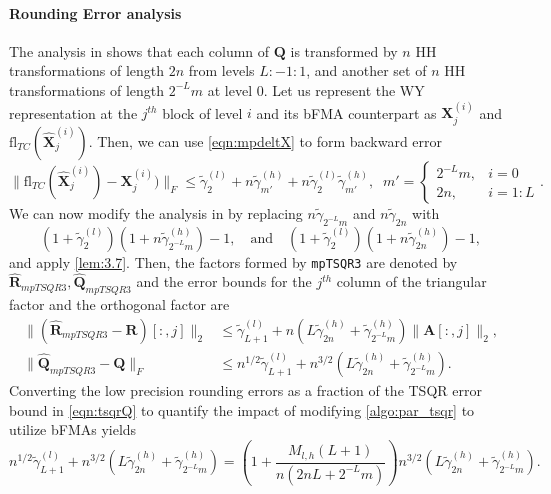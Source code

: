 \documentclass[review,onefignum,onetabnum]{siamart190516}
\newcommand{\bb}[1]{\mathbf{#1}}
\newcommand{\fl}{\mathrm{fl}}
\begin{document}
\paragraph{Rounding Error analysis} The analysis in \cite{Mori2012} shows that each column of $\bb{Q}$ is transformed by $n$ HH transformations of length $2n$ from levels $L:-1:1$, and another set of $n$ HH transformations of length $2^{-L}m$ at level $0$.
Let us represent the WY representation at the $j^{th}$ block of level $i$ and its bFMA counterpart as $\bb{X}_j^{(i)}$ and $\fl_{TC}(\hat{\bb{X}}_j^{(i)})$.
Then, we can use \cref{eqn:mpdeltX} to form backward error  
\begin{equation}
	\|\fl_{TC}(\hat{\bb{X}}_j^{(i)})-\bb{X}_j^{(i)})\|_F \leq \tilde{\gamma}_2^{(l)} +n\tilde{\gamma}_{m'}^{(h)} + n\tilde{\gamma}_2^{(l)}\tilde{\gamma}_{m'}^{(h)}, \;\; m' = \begin{cases}
	2^{-L}m, &i=0\\
	2n, & i = 1 : L
	\end{cases}.
\end{equation}
We can now modify the analysis in \cite{Mori2012} by replacing $n\tilde{\gamma}_{2^{-L}m}$ and $n\tilde{\gamma}_{2n}$ with \[(1+\tilde{\gamma}_2^{(l)})(1+n\tilde{\gamma}_{2^{-L}m}^{(h)})-1,\quad\text{and}\quad (1+\tilde{\gamma}_2^{(l)})(1+n\tilde{\gamma}_{2n}^{(h)})-1,\]
and apply \cref{lem:3.7}.
Then, the factors formed by {\tt mpTSQR3} are denoted by $\hat{\bb{R}}_{mpTSQR3},\hat{\bb{Q}}_{mpTSQR3}$ and the error bounds for the $j^{th}$ column of the triangular factor and the orthogonal factor are
\begin{align*}
\|(\hat{\bb{R}}_{mpTSQR3}- \bb{R})[:,j]\|_2 &\leq \tilde{\gamma}_{L+1}^{(l)}+n\left(L\tilde{\gamma}_{2n}^{(h)}+\tilde{\gamma}_{2^{-L}m}^{(h)}\right)\|\bb{A}[:,j]\|_2\label{eqn:mpTSQR1},\\
	\|\hat{\bb{Q}}_{mpTSQR3} - \bb{Q}\|_F &\leq n^{1/2}\tilde{\gamma}_{L+1}^{(l)}+n^{3/2}\left(L\tilde{\gamma}_{2n}^{(h)}+\tilde{\gamma}_{2^{-L}m}^{(h)}\right).
\end{align*}
Converting the low precision rounding errors as a fraction of the TSQR error bound in \cref{eqn:tsqrQ} to quantify the impact of modifying \cref{algo:par_tsqr} to utilize bFMAs yields
\begin{equation}
	n^{1/2}\tilde{\gamma}_{L+1}^{(l)}+n^{3/2}\left(L\tilde{\gamma}_{2n}^{(h)}+\tilde{\gamma}_{2^{-L}m}^{(h)}\right) = \left(1+ \frac{M_{l,h}(L+1)}{n(2nL+2^{-L}m)}\right)n^{3/2}\left(L\tilde{\gamma}_{2n}^{(h)}+\tilde{\gamma}_{2^{-L}m}^{(h)}\right).\label{eqn:mpTSQR3}
\end{equation}
\end{document}
